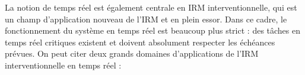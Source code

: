 
La notion de temps réel est également centrale en IRM interventionnelle, qui est un champ d’application nouveau de l’IRM et en plein essor. Dans ce cadre, le fonctionnement du système en temps réel est beaucoup plus strict : des tâches en temps réel critiques existent et doivent absolument respecter les échéances prévues. On peut citer deux grands domaines d’applications de l’IRM interventionnelle en temps réel :\\
